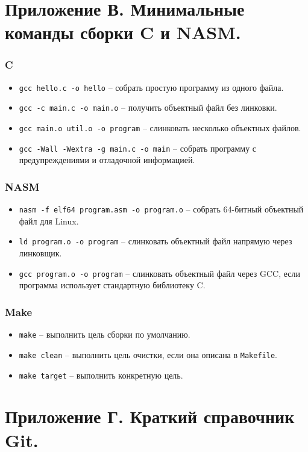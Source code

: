 \chapter{Приложение В. Минимальные команды сборки C и NASM.}

\subsection*{C}
\begin{itemize}
    \item \texttt{gcc hello.c -o hello} -- собрать простую программу из одного файла.
    \item \texttt{gcc -c main.c -o main.o} -- получить объектный файл без линковки.
    \item \texttt{gcc main.o util.o -o program} -- слинковать несколько объектных файлов.
    \item \texttt{gcc -Wall -Wextra -g main.c -o main} -- собрать программу с предупреждениями и отладочной информацией.
\end{itemize}

\subsection*{NASM}
\begin{itemize}
    \item \texttt{nasm -f elf64 program.asm -o program.o} -- собрать 64-битный объектный файл для Linux.
    \item \texttt{ld program.o -o program} -- слинковать объектный файл напрямую через линковщик.
    \item \texttt{gcc program.o -o program} -- слинковать объектный файл через GCC, если программа использует стандартную библиотеку C.
\end{itemize}

\subsection*{Make}
\begin{itemize}
    \item \texttt{make} -- выполнить цель сборки по умолчанию.
    \item \texttt{make clean} -- выполнить цель очистки, если она описана в \texttt{Makefile}.
    \item \texttt{make target} -- выполнить конкретную цель.
\end{itemize}

\chapter{Приложение Г. Краткий справочник Git.}

